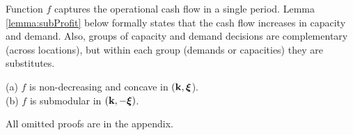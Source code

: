 \documentclass[mnsc,nonblindrev,copyedit]{informs2_wz} %
\newcommand{\proof}{\noindent{\bf Proof: } }
\newcommand{\qed}{ \hfill $\Box$ }
\newcommand{\OUT}[1]{}
\newcommand{\xiv}{\mbox{\boldmath$\xi$}}
\newcommand{\etav}{\mbox{\boldmath$\eta$}}
\newcommand{\lambdav}{\mbox{\boldmath$\lambda$}}
\newcommand{\alphav}{\mbox{\boldmath$\alpha$}}
\begin{document}
Function $f$ captures the operational cash flow in a single period. 
Lemma \ref{lemma:subProfit} below formally states that the cash flow increases in capacity and demand.  Also, groups of capacity and demand decisions are complementary (across locations), but within each group (demands or capacities) they are substitutes.


{\lemma (a) $f$ is non-decreasing and concave in $(\bold k, \xiv$).
\label{lemma:conProfit}\\
 (b) $f$ is submodular in $(\bold k, -\xiv)$.
\label{lemma:subProfit}}

All omitted proofs are in the appendix.








\OUT{
\proof For simplicity of the presentation, let $\alpha_{jl}$ be the coefficient of decision variable of objective function in (\ref{eqn:profit}), {\it i.e.}, $\alpha_{dd} = p-c, \; \alpha_{od} = p-cs-t,\; \alpha_{do} = sp -c -t, \; \alpha_{oo} = s(p-c)$.  To prove submodularity, we first write the dual of the production problem:
\begin{eqnarray*}
\begin{array}{lll}
    f(s,\bold k, \xiv) &=& \min_{(\etav, \lambdav) \in B (\alphav)} G (\etav, \lambdav, \bold k ,\xiv)  \\
    G(\etav,\lambdav,\bold k, \xiv) &=& \etav \bold k + \lambdav \xiv \\
    B (\alphav) &=& \{\eta_j+\lambda_l  \leq \alpha_{jl} \; \forall j \in \{d,o\}, \; \forall l \in \{d,o\},\;  \etav \geq 0,\; \lambdav \geq 0 \}
\end{array}
\end{eqnarray*}
To see the relationship between $\bold k$ and $-\xiv$, we substitute $\bar{\xiv} = - \xiv$ and $\bar{\etav} = - \etav$.  Then, the dual problem becomes:
\begin{eqnarray*}
\begin{array}{lll}
    f(s,\bold k, \xiv) &=& \min_{(\bar{\etav}, \lambdav) \in B_1 (\alphav)} G (\bar{\etav}, \lambdav, \bold k ,\bar{\xiv})  \\
    G(\bar{\etav},\lambdav,\bold k, \bar{\xiv}) &=& -\bar{\etav} \bold k - \lambdav \bar{\xiv} \\
     B_1(\alphav) &=& \{-\bar{\eta}_j+\lambda_l  \leq \alpha_{jl} \; \forall j \in \{d,o\}, \; \forall l \in \{d,o\},\;  \bar{\etav} \leq 0,\; \lambdav \geq 0 \}
\end{array}
\end{eqnarray*}
The objective function $G$ is submodular in $(\bar{\etav},\bold k,\lambdav, \bar{\xiv})$ and the constraint set $B_1$  is a sublattice of $(\bar{\etav},\lambdav)$.  Since minimizing submodular function over a sublattice preserves submodularity, $f$ is submodular in $(\bold{k}, -\xiv)$.  \qed
}
\end{document}
